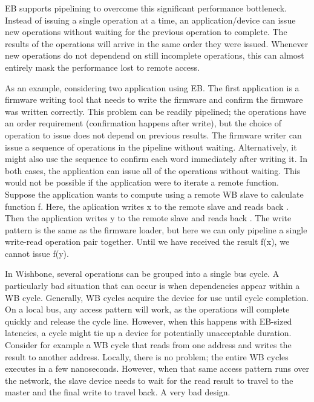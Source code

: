 \vspace{5 mm}

\noindent  EB supports pipelining to overcome this significant performance bottleneck. 
Instead of issuing a single operation at a time, an application/device can issue new operations without waiting for the previous operation to complete. 
The results of the operations will arrive in the same order they were issued. 
Whenever new operations do not dependend on still incomplete operations, this can almost entirely mask the performance lost to remote access.

\vspace{5 mm}

\noindent As an example, considering two application using EB. 
The first application is a firmware writing tool that needs to write the firmware and confirm the firmware was written correctly. 
This problem can be readily pipelined; the operations have an order requirement (confirmation happens after write), but the choice of operation to issue
does not depend on previous results. 
The firmware writer can issue a sequence of  operations in the pipeline without waiting.
Alternatively, it might also use the sequence  to confirm each word immediately after writing it. 
In both cases, the application can issue all of the operations without waiting. 
This would not be possible if the application were to iterate a remote function. 
Suppose the application wants to compute  using a remote WB slave to calculate function f. 
Here, the aplication writes x to the remote slave and reads back . 
Then the application writes y to the remote slave and reads back .
The write pattern  is the same as the firmware loader, but here we can only pipeline a single write-read operation pair together. 
Until we have received the result f(x), we cannot issue f(y).

\vspace{5 mm}

\noindent In Wishbone, several operations can be grouped into a single bus cycle.
A particularly bad situation that can occur is when dependencies appear within a WB cycle. 
Generally, WB cycles acquire the device for use until cycle completion. 
On a local bus, any access pattern will work, as the operations will complete quickly and release the cycle line. 
However, when this happens with EB-sized latencies, a cycle might tie up a device for potentially unacceptable duration. 
Consider for example a WB cycle that reads from one address and writes the result to another address.
Locally, there is no problem; the entire WB cycles executes in a few nanoseconds. 
However, when that same access pattern runs over the network, the slave device needs to wait for the read result to travel to the master and the final write to travel back. 
A very bad design.

